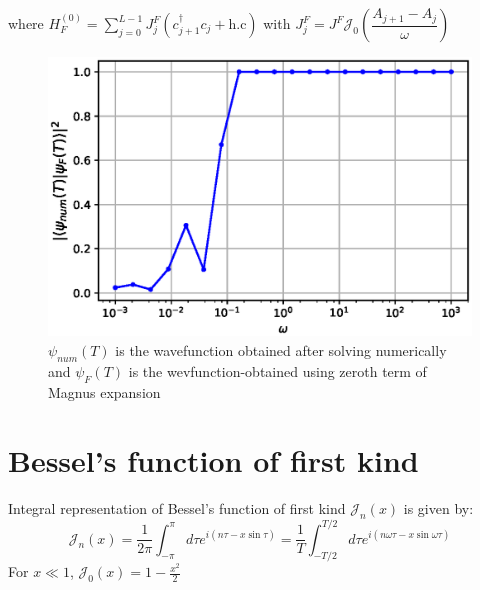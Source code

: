 \documentclass[11pt,a4paper]{article}
\begin{document}
where $H_F^{(0)}= \sum_{j=0}^{L-1} J_{j}^F (c_{j+1}^{\dagger} c_j + \mbox{h.c})$ with $J_{j}^F=J^F \mathcal{J}_0 \left(\dfrac{A_{j+1}- A_j}{\omega}\right)$

\begin{figure}[!ht]
\begin{center}
\includegraphics[scale=0.5]{pics/single_body_L51_floquet.eps} 
\caption{$\psi_{num}(T)$ is the wavefunction obtained after solving numerically and $\psi_F (T)$ is the wevfunction-obtained using zeroth term of Magnus expansion}
\end{center}
\end{figure}
\section{Bessel's function of first kind}
Integral representation of Bessel's function of first kind $\mathcal{J}_n (x)$ is given by:
\begin{equation}
\mathcal{J}_n (x)=  \frac{1}{2 \pi} \int_{-\pi}^\pi d\tau e^{i(n \tau - x \sin \tau)}= \frac{1}{T} \int_{-T/2}^{T/2} d\tau e^{i(n   \omega \tau - x \sin \omega \tau)}
\end{equation}
For $x \ll1$, $\mathcal{J}_0 (x)= 1- \frac{x^2}{2}$
\end{document}
